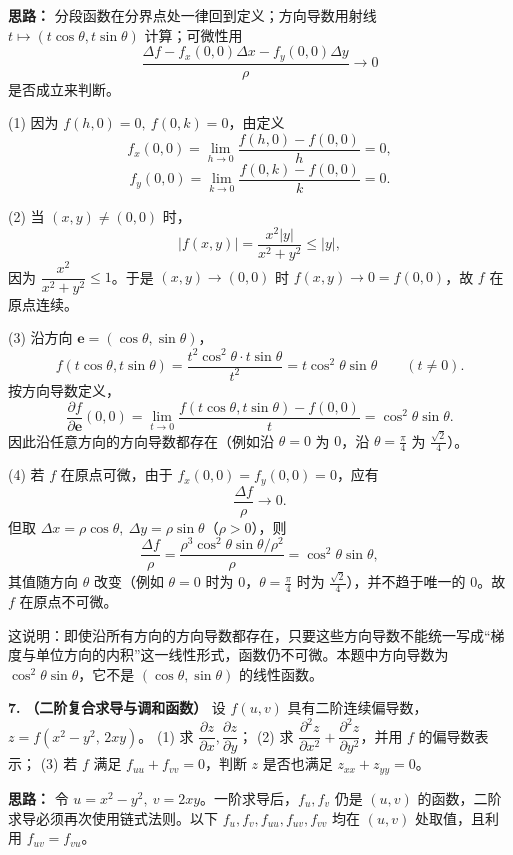 \ifshowsolutions%
\textbf{思路：} 分段函数在分界点处一律回到定义；方向导数用射线 \(t\mapsto(t\cos\theta,t\sin\theta)\) 计算；可微性用
\[
\frac{\varDelta f-f_x(0,0)\varDelta x-f_y(0,0)\varDelta y}{\rho}\to0
\]
是否成立来判断。

(1) 因为 \(f(h,0)=0,\ f(0,k)=0\)，由定义
\[
f_x(0,0)=\lim_{h\to0}\frac{f(h,0)-f(0,0)}{h}=0,
\]
\[
f_y(0,0)=\lim_{k\to0}\frac{f(0,k)-f(0,0)}{k}=0.
\]

(2) 当 \((x,y)\neq(0,0)\) 时，
\[
|f(x,y)|=\frac{x^2|y|}{x^2+y^2}\le |y|,
\]
因为 \(\dfrac{x^2}{x^2+y^2}\le1\)。于是 \((x,y)\to(0,0)\) 时 \(f(x,y)\to0=f(0,0)\)，故 \(f\) 在原点连续。

(3) 沿方向 \(\mathbf e=(\cos\theta,\sin\theta)\)，
\[
f(t\cos\theta,t\sin\theta)
=\frac{t^2\cos^2\theta\cdot t\sin\theta}{t^2}
=t\cos^2\theta\sin\theta\qquad(t\neq0).
\]
按方向导数定义，
\[
\frac{\partial f}{\partial\mathbf e}(0,0)
=\lim_{t\to0}\frac{f(t\cos\theta,t\sin\theta)-f(0,0)}{t}
=\cos^2\theta\sin\theta.
\]
因此沿任意方向的方向导数都存在（例如沿 \(\theta=0\) 为 \(0\)，沿 \(\theta=\frac{\pi}{4}\) 为 \(\frac{\sqrt2}{4}\)）。

(4) 若 \(f\) 在原点可微，由于 \(f_x(0,0)=f_y(0,0)=0\)，应有
\[
\frac{\varDelta f}{\rho}\to0.
\]
但取 \(\varDelta x=\rho\cos\theta,\ \varDelta y=\rho\sin\theta\)（\(\rho>0\)），则
\[
\frac{\varDelta f}{\rho}
=\frac{\rho^3\cos^2\theta\sin\theta/\rho^2}{\rho}
=\cos^2\theta\sin\theta,
\]
其值随方向 \(\theta\) 改变（例如 \(\theta=0\) 时为 \(0\)，\(\theta=\frac{\pi}{4}\) 时为 \(\frac{\sqrt2}{4}\)），并不趋于唯一的 \(0\)。故 \(f\) 在原点不可微。

这说明：即使沿所有方向的方向导数都存在，只要这些方向导数不能统一写成“梯度与单位方向的内积”这一线性形式，函数仍不可微。本题中方向导数为 \(\cos^2\theta\sin\theta\)，它不是 \((\cos\theta,\sin\theta)\) 的线性函数。

\else \answerarea[10] \fi%

\textbf{7.} \textbf{（二阶复合求导与调和函数）} 设 \(f(u,v)\) 具有二阶连续偏导数，\(z=f(x^2-y^2,\,2xy)\)。
(1) 求 \(\dfrac{\partial z}{\partial x},\dfrac{\partial z}{\partial y}\)；
(2) 求 \(\dfrac{\partial^2 z}{\partial x^2}+\dfrac{\partial^2 z}{\partial y^2}\)，并用 \(f\) 的偏导数表示；
(3) 若 \(f\) 满足 \(f_{uu}+f_{vv}=0\)，判断 \(z\) 是否也满足 \(z_{xx}+z_{yy}=0\)。

\ifshowsolutions%
\textbf{思路：} 令 \(u=x^2-y^2,\ v=2xy\)。一阶求导后，\(f_u,f_v\) 仍是 \((u,v)\) 的函数，二阶求导必须再次使用链式法则。以下 \(f_u,f_v,f_{uu},f_{uv},f_{vv}\) 均在 \((u,v)\) 处取值，且利用 \(f_{uv}=f_{vu}\)。

